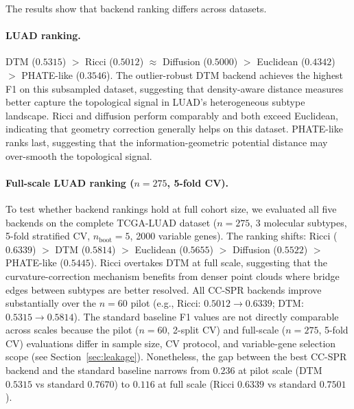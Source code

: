 \documentclass[11pt]{article}
\begin{document}
The results show that backend ranking differs across datasets.

\paragraph{LUAD ranking.}
DTM ($0.5315$) $>$ Ricci ($0.5012$) $\approx$ Diffusion ($0.5000$) $>$ Euclidean ($0.4342$) $>$ PHATE-like ($0.3546$).
The outlier-robust DTM backend achieves the highest F1 on this subsampled dataset, suggesting that density-aware distance measures better capture the topological signal in LUAD's heterogeneous subtype landscape.
Ricci and diffusion perform comparably and both exceed Euclidean, indicating that geometry correction generally helps on this dataset.
PHATE-like ranks last, suggesting that the information-geometric potential distance may over-smooth the topological signal.

\paragraph{Full-scale LUAD ranking ($n = 275$, 5-fold CV).}
To test whether backend rankings hold at full cohort size, we evaluated all five backends on the complete TCGA-LUAD dataset ($n = 275$, 3 molecular subtypes, 5-fold stratified CV, $n_{\text{boot}} = 5$, 2000 variable genes).
The ranking shifts: Ricci ($0.6339$) $>$ DTM ($0.5814$) $>$ Euclidean ($0.5655$) $>$ Diffusion ($0.5522$) $>$ PHATE-like ($0.5445$).
Ricci overtakes DTM at full scale, suggesting that the curvature-correction mechanism benefits from denser point clouds where bridge edges between subtypes are better resolved.
All CC-SPR backends improve substantially over the $n = 60$ pilot (e.g., Ricci: $0.5012 \to 0.6339$; DTM: $0.5315 \to 0.5814$).
The standard baseline F1 values are not directly comparable across scales because the pilot ($n = 60$, 2-split CV) and full-scale ($n = 275$, 5-fold CV) evaluations differ in sample size, CV protocol, and variable-gene selection scope (see Section~\ref{sec:leakage}).
Nonetheless, the gap between the best CC-SPR backend and the standard baseline narrows from $0.236$ at pilot scale (DTM $0.5315$ vs standard $0.7670$) to $0.116$ at full scale (Ricci $0.6339$ vs standard $0.7501$).
\end{document}
